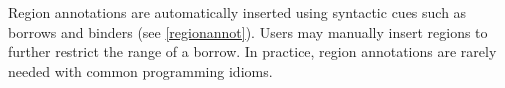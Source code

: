 Region annotations are automatically inserted using
syntactic cues such as borrows and binders (see
\cref{regionannot}).  Users may manually insert regions to further restrict the range of a
borrow. In practice, region annotations are
rarely needed with common programming idioms.





